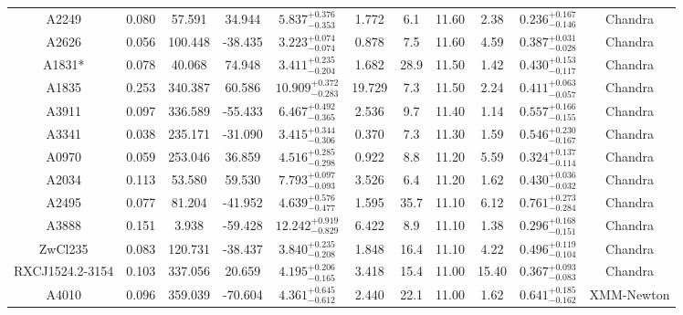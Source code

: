 \documentclass{aa}   %
\begin{document}
\begin{table}[h!]
\begin{center}
\begin{tabular}{ c  c  c  c c c c c c c c }
A2249               		&		0.080	&	57.591	&	34.944	& $	5.837^{+0.376}_{-0.353}$  &      1.772	&  6.1	&	11.60	&	2.38	&	$ 0.236^{+0.167}_{-0.146}  $ &	  Chandra     \\
A2626               		&		0.056	&	100.448	&	-38.435	& $	3.223^{+0.074}_{-0.074}$  &      0.878	&  7.5	&	11.60	&	4.59	&	$ 0.387^{+0.031}_{-0.028}  $ &	  Chandra     \\
A1831*              		&		0.078	&	40.068	&	74.948	& $	3.411^{+0.235}_{-0.204}$  &      1.682	&  28.9	&	11.50	&	1.42	&	$ 0.430^{+0.153}_{-0.117}  $ &	  Chandra     \\
A1835               		&		0.253	&	340.387	&	60.586	& $ 10.909^{+0.372}_{-0.283}$ &     19.729	&  7.3	&	11.50	&	2.24	&	$ 0.411^{+0.063}_{-0.057}  $ &	  Chandra     \\
A3911               		&		0.097	&	336.589	&	-55.433	& $	6.467^{+0.492}_{-0.365}$  &      2.536	&  9.7	&	11.40	&	1.14	&	$ 0.557^{+0.166}_{-0.155}  $ &	  Chandra     \\
A3341               		&		0.038	&	235.171	&	-31.090	& $	3.415^{+0.344}_{-0.306}$  &      0.370	&  7.3	&	11.30	&	1.59	&	$ 0.546^{+0.230}_{-0.167}  $ &	  Chandra     \\
A0970               		&		0.059	&	253.046	&	36.859	& $	4.516^{+0.285}_{-0.298}$  &      0.922	&  8.8	&	11.20	&	5.59	&	$ 0.324^{+0.137}_{-0.114}  $ &	 Chandra      \\
A2034               		&		0.113	&	53.580	&	59.530	& $	7.793^{+0.097}_{-0.093}$  &      3.526	&  6.4	&	11.20	&	1.62	&	$ 0.430^{+0.036}_{-0.032}  $ &	  Chandra     \\
A2495               		&		0.077	&	81.204	&	-41.952	& $	4.639^{+0.576}_{-0.477}$  &      1.595	&  35.7	&	11.10	&	6.12	&	$ 0.761^{+0.273}_{-0.284}  $ &	 Chandra      \\
A3888               		&		0.151	&	3.938	&	-59.428	& $ 12.242^{+0.919}_{-0.829}$ &      6.422	&  8.9	&	11.10	&	1.38	&	$ 0.296^{+0.168}_{-0.151}  $ &	  Chandra     \\
ZwCl235             		&		0.083	&	120.731	&	-38.437	& $	3.840^{+0.235}_{-0.208}$  &      1.848	&  16.4	&	11.10	&	4.22	&	$ 0.496^{+0.119}_{-0.104}  $ &	  Chandra     \\
RXCJ1524.2-3154     		&		0.103	&	337.056	&	20.659	& $	4.195^{+0.206}_{-0.165}$  &      3.418	&  15.4	&	11.00	&	15.40	&	$ 0.367^{+0.093}_{-0.083}  $ &	 Chandra      \\
A4010               		&		0.096	&	359.039	&	-70.604	& $	4.361^{+0.645}_{-0.612}$  &      2.440	&  22.1	&	11.00	&	1.62	&	$ 0.641^{+0.185}_{-0.162}  $ &	  XMM-Newton  \\

\end{tabular}
\end{center}
\end{table}
\end{document}
